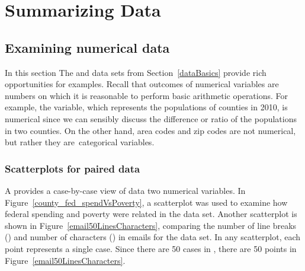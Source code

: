 \chapter{Summarizing Data} 
\label{summarizingData}


\section{Examining numerical data}
\label{numericalData}
In this section  The  and  data sets from Section~\ref{dataBasics} provide rich opportunities for examples. Recall that outcomes of numerical variables are numbers on which it is reasonable to perform basic arithmetic operations. For example, the  variable, which represents the populations of counties in 2010, is numerical since we can sensibly discuss the difference or ratio of the populations in two counties. On the other hand, area codes and zip codes are not numerical, but rather they are~categorical variables.


\subsection{Scatterplots for paired data}
\label{scatterPlots}



A  provides a case-by-case view of data  two numerical variables.  In Figure~\vref{county_fed_spendVsPoverty}, a scatterplot was used to examine how federal spending and poverty were related in the  data set. Another scatterplot is shown in Figure~\ref{email50LinesCharacters}, comparing the number of line breaks () and number of characters () in emails for the  data set. In any scatterplot, each point represents a single case. Since there are 50 cases in , there are 50 points in Figure~\ref{email50LinesCharacters}. 


